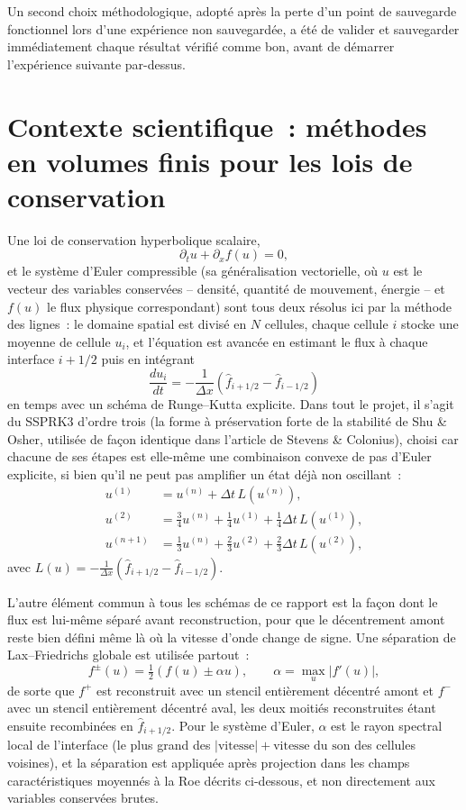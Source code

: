 \documentclass[11pt]{article}
\begin{document}
Un second choix méthodologique, adopté après la perte d'un point de
sauvegarde fonctionnel lors d'une expérience non sauvegardée, a été de
valider et sauvegarder immédiatement chaque résultat vérifié comme bon,
avant de démarrer l'expérience suivante par-dessus.

\section{Contexte scientifique~: méthodes en volumes finis pour les lois de conservation}
\label{sec:fond-vf}

Une loi de conservation hyperbolique scalaire,
\[
\partial_t u + \partial_x f(u) = 0,
\]
et le système d'Euler compressible (sa généralisation vectorielle, où $u$
est le vecteur des variables conservées -- densité, quantité de mouvement,
énergie -- et $f(u)$ le flux physique correspondant) sont tous deux
résolus ici par la méthode des lignes~: le domaine spatial est divisé en
$N$ cellules, chaque cellule $i$ stocke une moyenne de cellule $u_i$, et
l'équation est avancée en estimant le flux à chaque interface $i+1/2$ puis
en intégrant
\[
\frac{d u_i}{dt} = -\frac{1}{\Delta x}\left(\hat f_{i+1/2} - \hat f_{i-1/2}\right)
\]
en temps avec un schéma de Runge--Kutta explicite. Dans tout le projet, il
s'agit du SSPRK3 d'ordre trois (la forme à préservation forte de la
stabilité de Shu \& Osher, utilisée de façon identique dans l'article de
Stevens \& Colonius), choisi car chacune de ses étapes est elle-même une
combinaison convexe de pas d'Euler explicite, si bien qu'il ne peut pas
amplifier un état déjà non oscillant~:
\begin{align*}
u^{(1)} &= u^{(n)} + \Delta t\, L(u^{(n)}), \\
u^{(2)} &= \tfrac{3}{4}u^{(n)} + \tfrac{1}{4}u^{(1)} + \tfrac{1}{4}\Delta t\, L(u^{(1)}), \\
u^{(n+1)} &= \tfrac{1}{3}u^{(n)} + \tfrac{2}{3}u^{(2)} + \tfrac{2}{3}\Delta t\, L(u^{(2)}),
\end{align*}
avec $L(u) = -\frac{1}{\Delta x}(\hat f_{i+1/2} - \hat f_{i-1/2})$.

L'autre élément commun à tous les schémas de ce rapport est la façon dont
le flux est lui-même séparé avant reconstruction, pour que le
décentrement amont reste bien défini même là où la vitesse d'onde change
de signe. Une séparation de Lax--Friedrichs globale est utilisée partout~:
\[
f^{\pm}(u) = \tfrac{1}{2}\left(f(u) \pm \alpha u\right), \qquad
\alpha = \max_u \left|f'(u)\right|,
\]
de sorte que $f^+$ est reconstruit avec un stencil entièrement décentré
amont et $f^-$ avec un stencil entièrement décentré aval, les deux
moitiés reconstruites étant ensuite recombinées en $\hat f_{i+1/2}$. Pour
le système d'Euler, $\alpha$ est le rayon spectral local de l'interface
(le plus grand des $|\text{vitesse}| + \text{vitesse du son}$ des
cellules voisines), et la séparation est appliquée après projection dans
les champs caractéristiques moyennés à la Roe décrits ci-dessous, et non
directement aux variables conservées brutes.
\end{document}
